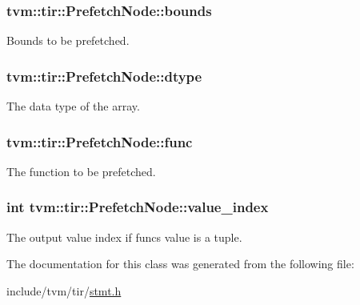 \subsubsection[{\texorpdfstring{bounds}{bounds}}]{ tvm\+::tir\+::\+Prefetch\+Node\+::bounds}\hypertarget{classtvm_1_1tir_1_1PrefetchNode_a9ce8a82f03dd23e200ec6c611fddeb9c}{}\label{classtvm_1_1tir_1_1PrefetchNode_a9ce8a82f03dd23e200ec6c611fddeb9c}


Bounds to be prefetched. 

\subsubsection[{\texorpdfstring{dtype}{dtype}}]{ tvm\+::tir\+::\+Prefetch\+Node\+::dtype}\hypertarget{classtvm_1_1tir_1_1PrefetchNode_aaeccff8519185fc44caa07005ef56af3}{}\label{classtvm_1_1tir_1_1PrefetchNode_aaeccff8519185fc44caa07005ef56af3}


The data type of the array. 

\subsubsection[{\texorpdfstring{func}{func}}]{ tvm\+::tir\+::\+Prefetch\+Node\+::func}\hypertarget{classtvm_1_1tir_1_1PrefetchNode_a59428251589e635271007c8b92a051e0}{}\label{classtvm_1_1tir_1_1PrefetchNode_a59428251589e635271007c8b92a051e0}


The function to be prefetched. 

\subsubsection[{\texorpdfstring{value\+\_\+index}{value_index}}]{\setlength{\rightskip}{0pt plus 5cm}int tvm\+::tir\+::\+Prefetch\+Node\+::value\+\_\+index}\hypertarget{classtvm_1_1tir_1_1PrefetchNode_a0c2bdc2deb363f41b0362c6a9ed4296f}{}\label{classtvm_1_1tir_1_1PrefetchNode_a0c2bdc2deb363f41b0362c6a9ed4296f}


The output value index if func\textquotesingle{}s value is a tuple. 



The documentation for this class was generated from the following file\+:\begin{DoxyCompactItemize}
\item 
include/tvm/tir/\hyperlink{stmt_8h}{stmt.\+h}\end{DoxyCompactItemize}
